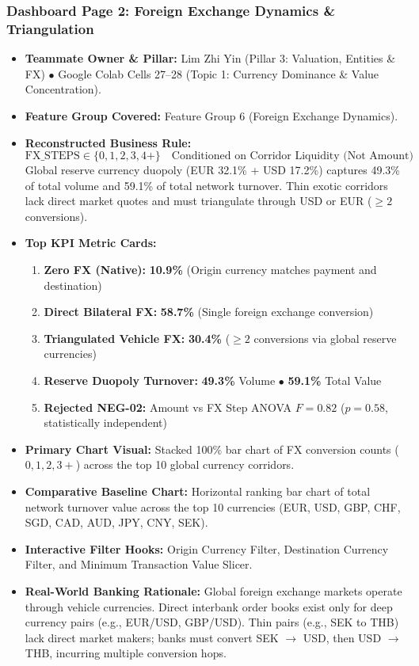 \documentclass[11pt,a4paper]{article}
\begin{document}
\subsubsection{Dashboard Page 2: Foreign Exchange Dynamics \& Triangulation}
\begin{itemize}
    \item \textbf{Teammate Owner \& Pillar:} Lim Zhi Yin (Pillar 3: Valuation, Entities \& FX) $\bullet$ Google Colab Cells 27--28 (Topic 1: Currency Dominance \& Value Concentration).
    \item \textbf{Feature Group Covered:} Feature Group 6 (Foreign Exchange Dynamics).
    \item \textbf{Reconstructed Business Rule:}
    \begin{equation}
    \text{FX\_STEPS} \in \{0, 1, 2, 3, 4+\} \quad \text{Conditioned on Corridor Liquidity (Not Amount)}
    \end{equation}
    Global reserve currency duopoly (EUR 32.1\% + USD 17.2\%) captures 49.3\% of total volume and 59.1\% of total network turnover. Thin exotic corridors lack direct market quotes and must triangulate through USD or EUR ($\ge 2$ conversions).
    \item \textbf{Top KPI Metric Cards:}
    \begin{enumerate}
        \item \textbf{Zero FX (Native):} \textbf{10.9\%} (Origin currency matches payment and destination)
        \item \textbf{Direct Bilateral FX:} \textbf{58.7\%} (Single foreign exchange conversion)
        \item \textbf{Triangulated Vehicle FX:} \textbf{30.4\%} ($\ge 2$ conversions via global reserve currencies)
        \item \textbf{Reserve Duopoly Turnover:} \textbf{49.3\%} Volume $\bullet$ \textbf{59.1\%} Total Value
        \item \textbf{Rejected NEG-02:} Amount vs FX Step ANOVA $F=0.82$ ($p=0.58$, statistically independent)
    \end{enumerate}
    \item \textbf{Primary Chart Visual:} Stacked 100\% bar chart of FX conversion counts ($0, 1, 2, 3+$) across the top 10 global currency corridors.
    \item \textbf{Comparative Baseline Chart:} Horizontal ranking bar chart of total network turnover value across the top 10 currencies (EUR, USD, GBP, CHF, SGD, CAD, AUD, JPY, CNY, SEK).
    \item \textbf{Interactive Filter Hooks:} Origin Currency Filter, Destination Currency Filter, and Minimum Transaction Value Slicer.
    \item \textbf{Real-World Banking Rationale:} Global foreign exchange markets operate through vehicle currencies. Direct interbank order books exist only for deep currency pairs (e.g., EUR/USD, GBP/USD). Thin pairs (e.g., SEK to THB) lack direct market makers; banks must convert SEK $\to$ USD, then USD $\to$ THB, incurring multiple conversion hops.
\end{itemize}
\end{document}
